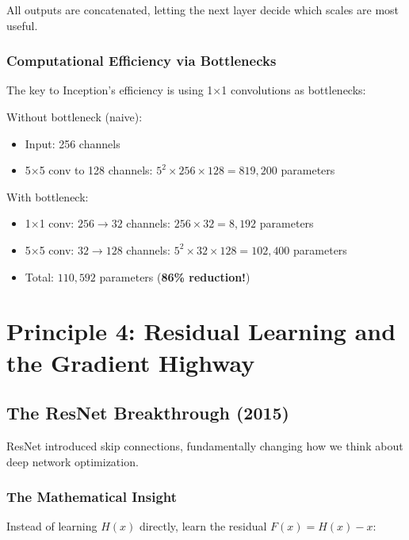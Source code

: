 \documentclass{article}
\begin{document}
All outputs are concatenated, letting the next layer decide which scales are most useful.

\subsubsection{Computational Efficiency via Bottlenecks}

The key to Inception's efficiency is using 1×1 convolutions as bottlenecks:

\begin{tcolorbox}[colback=green!5!white, colframe=green!50!black, title=Bottleneck Example]
Without bottleneck (naive):
\begin{itemize}
    \item Input: 256 channels
    \item 5×5 conv to 128 channels: $5^2 \times 256 \times 128 = 819,200$ parameters
\end{itemize}

With bottleneck:
\begin{itemize}
    \item 1×1 conv: $256 \to 32$ channels: $256 \times 32 = 8,192$ parameters
    \item 5×5 conv: $32 \to 128$ channels: $5^2 \times 32 \times 128 = 102,400$ parameters
    \item Total: $110,592$ parameters (\textbf{86\% reduction!})
\end{itemize}
\end{tcolorbox}

\section{Principle 4: Residual Learning and the Gradient Highway}

\subsection{The ResNet Breakthrough (2015)}

ResNet introduced skip connections, fundamentally changing how we think about deep network optimization.

\subsubsection{The Mathematical Insight}

Instead of learning $H(x)$ directly, learn the residual $F(x) = H(x) - x$:
\end{document}
